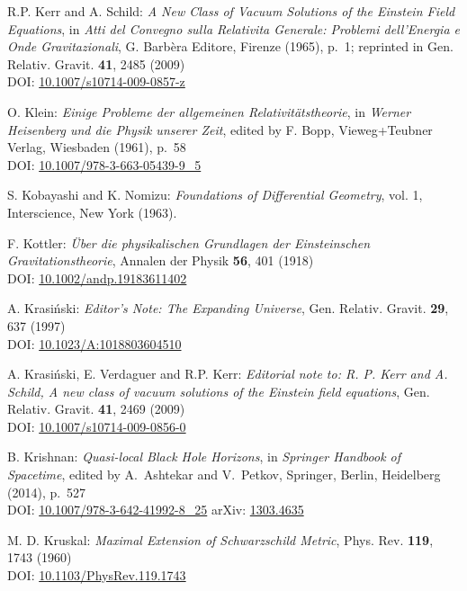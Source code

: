 \begin{thebibliography}{123}
R.P. Kerr and A. Schild:
{\em A New Class of Vacuum Solutions of the Einstein Field Equations},
in {\em Atti del Convegno sulla Relativita Generale: Problemi
dell’Energia e Onde Gravitazionali}, G. Barbèra Editore,
Firenze (1965), p.~1; reprinted in
Gen. Relativ. Gravit. {\bf 41}, 2485 (2009)\\
DOI: \href{https://doi.org/10.1007/s10714-009-0857-z}{10.1007/s10714-009-0857-z}

O. Klein:
{\em Einige Probleme der allgemeinen Relativitätstheorie},
in {\em Werner Heisenberg und die Physik unserer Zeit},
edited by F. Bopp, Vieweg+Teubner Verlag, Wiesbaden (1961), p.~58\\
DOI: \href{https://doi.org/10.1007/978-3-663-05439-9_5}{10.1007/978-3-663-05439-9\_5}

S. Kobayashi and K. Nomizu:
{\em Foundations of Differential Geometry}, vol. 1,
Interscience, New York (1963).

F.  Kottler:
{\em \"Uber die physikalischen Grundlagen der Einsteinschen Gravitationstheorie},
Annalen der Physik {\bf 56}, 401 (1918)\\
DOI: \href{https://doi.org/10.1002/andp.19183611402}{10.1002/andp.19183611402}

A. Krasi\'nski:
{\em Editor's Note: The Expanding Universe},
Gen. Relativ. Gravit. {\bf 29}, 637 (1997)\\
DOI: \href{https://doi.org/10.1023/A:1018803604510}{10.1023/A:1018803604510}

A. Krasi\'nski, E. Verdaguer and R.P. Kerr:
{\em Editorial note to: R. P. Kerr and A. Schild, A new class of vacuum solutions of the Einstein field equations},
Gen. Relativ. Gravit. {\bf 41}, 2469 (2009)\\
DOI: \href{https://doi.org/10.1007/s10714-009-0856-0}{10.1007/s10714-009-0856-0}

B. Krishnan:
{\em Quasi-local Black Hole Horizons},
in {\em Springer Handbook of Spacetime}, edited by A.~Ashtekar and V.~Petkov,
Springer, Berlin, Heidelberg (2014), p.~527\\
DOI: \href{https://doi.org/10.1007/978-3-642-41992-8_25}{10.1007/978-3-642-41992-8\_25}\hfill
arXiv: \href{https://arxiv.org/abs/1303.4635}{1303.4635}

M. D. Kruskal:
{\em Maximal Extension of Schwarzschild Metric},
Phys. Rev. {\bf 119}, 1743 (1960)\\
DOI: \href{https://doi.org/10.1103/PhysRev.119.1743}{10.1103/PhysRev.119.1743}


\end{thebibliography}
